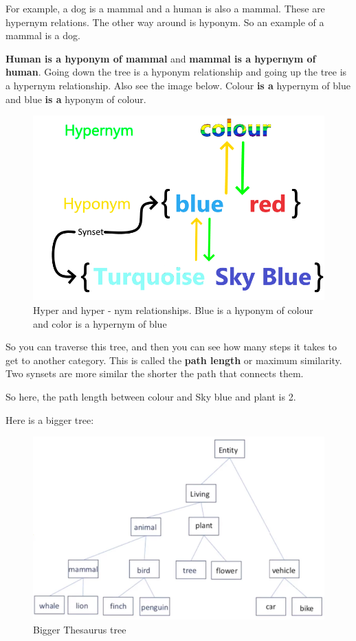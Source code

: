 \documentclass[
  11pt,
  british,
]{article}
\begin{document}
For example, a dog is a mammal and a human is also a mammal. These are
hypernym relations. The other way around is hyponym. So an example of a
mammal is a dog.

\textbf{Human is a hyponym of mammal} and \textbf{mammal is a hypernym
of human}. Going down the tree is a hyponym relationship and going up
the tree is a hypernym relationship. Also see the image below. Colour
\textbf{is a} hypernym of blue and blue \textbf{is a} hyponym of colour.

\begin{figure}
\centering
\includegraphics{hypo_hyper_nym.png}
\caption{Hyper and hyper - nym relationships. Blue is a hyponym of
colour and color is a hypernym of blue}
\end{figure}

So you can traverse this tree, and then you can see how many steps it
takes to get to another category. This is called the \textbf{path
length} or maximum similarity. Two synsets are more similar the shorter
the path that connects them.

So here, the path length between colour and Sky blue and plant is 2.

Here is a bigger tree:

\begin{figure}
\centering
\includegraphics{Pasted_image_20220213185844.png}
\caption{Bigger Thesaurus tree}
\end{figure}
\end{document}
